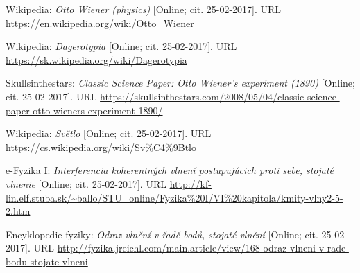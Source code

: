 \documentclass[12pt,a4paper,titlepage,final]{article}
\begin{document}
\newpage

\begin{thebibliography}{9}
	
	Wikipedia:
	\emph{Otto Wiener (physics)} [Online; cit. 25-02-2017].
	\newline
	URL 
	\url{https://en.wikipedia.org/wiki/Otto_Wiener}
	
	Wikipedia:
	\emph{Dagerotypia} [Online; cit. 25-02-2017].
	URL 
	\url{https://sk.wikipedia.org/wiki/Dagerotypia}
	
	Skullsinthestars:
	\emph{Classic Science Paper: Otto Wiener's experiment (1890)} [Online; cit. 25-02-2017]. URL \url{https://skullsinthestars.com/2008/05/04/classic-science-paper-otto-wieners-experiment-1890/}
	
	Wikipedia:
	\emph{Světlo} [Online; cit. 25-02-2017].
	URL
	\url{https://cs.wikipedia.org/wiki/Sv%C4%9Btlo}
		
		e-Fyzika I:
		\emph{Interferencia koherentných vlnení postupujúcich proti sebe, stojaté vlnenie} [Online; cit. 25-02-2017].
		URL \url{http://kf-lin.elf.stuba.sk/~ballo/STU_online/Fyzika%20I/VI%20kapitola/kmity-vlny2-5-2.htm}
			
			Encyklopedie fyziky:
			\emph{Odraz vlnění v řadě bodů, stojaté vlnění} [Online; cit. 25-02-2017].
			URL
			\url{http://fyzika.jreichl.com/main.article/view/168-odraz-vlneni-v-rade-bodu-stojate-vlneni
			}
			
			
		\end{thebibliography}
\end{document}
